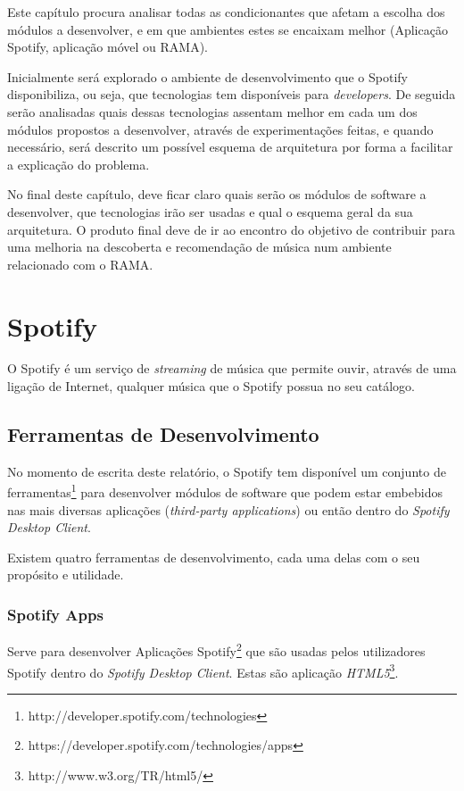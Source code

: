 Este capítulo procura analisar todas as condicionantes que afetam a escolha  dos módulos a desenvolver, e em que ambientes estes se encaixam melhor (Aplicação Spotify, aplicação móvel ou RAMA).

Inicialmente será explorado o ambiente de desenvolvimento que o Spotify disponibiliza, ou seja, que tecnologias tem disponíveis para \emph{developers}.
De seguida serão analisadas quais dessas tecnologias assentam melhor em cada um dos módulos propostos a desenvolver, através de experimentações feitas, e quando necessário, será descrito um possível esquema de arquitetura por forma a facilitar a explicação do problema.


No final deste capítulo, deve ficar claro quais serão os módulos de software a desenvolver, que tecnologias irão ser usadas e qual o esquema geral da sua arquitetura.
O produto final deve de ir ao encontro do objetivo de contribuir para uma melhoria na descoberta e recomendação de música num ambiente relacionado com o RAMA.


\section{Spotify} %
\label{sec:spotify}

  O Spotify é um serviço de \emph{streaming} de música que permite ouvir, através de uma ligação de Internet, qualquer música que o Spotify possua no seu catálogo.


  \subsection{Ferramentas de Desenvolvimento} %
  \label{sub:ferramentas_de_desenvolvimento}
  
    No momento de escrita deste relatório, o Spotify tem disponível um conjunto de ferramentas\footnote{http://developer.spotify.com/technologies} para desenvolver módulos de software que podem estar embebidos nas mais diversas aplicações (\emph{third-party applications}) ou então dentro do \emph{Spotify Desktop Client}.

    Existem quatro ferramentas de desenvolvimento, cada uma delas com o seu propósito e utilidade.


    \subsubsection{Spotify Apps} %
    \label{ssub:spotify_apps}
      Serve para desenvolver Aplicações Spotify\footnote{https://developer.spotify.com/technologies/apps} que são usadas pelos utilizadores Spotify dentro do \emph{Spotify Desktop Client}. Estas são aplicação \emph{HTML5}\footnote{http://www.w3.org/TR/html5/}.

